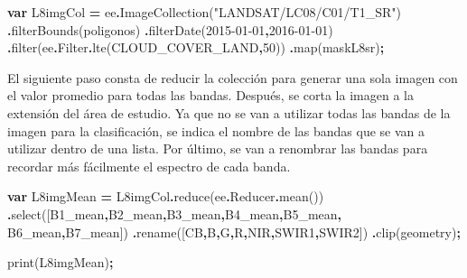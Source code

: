 \documentclass[
  12pt,
  letterpaper,
  twoside]{book}
\newenvironment{Shaded}{\begin{snugshade}}{\end{snugshade}}
\newcommand{\AttributeTok}[1]{\textcolor[rgb]{0.77,0.63,0.00}{#1}}
\newcommand{\DecValTok}[1]{\textcolor[rgb]{0.00,0.00,0.81}{#1}}
\newcommand{\FunctionTok}[1]{\textcolor[rgb]{0.00,0.00,0.00}{#1}}
\newcommand{\KeywordTok}[1]{\textcolor[rgb]{0.13,0.29,0.53}{\textbf{#1}}}
\newcommand{\NormalTok}[1]{#1}
\newcommand{\OperatorTok}[1]{\textcolor[rgb]{0.81,0.36,0.00}{\textbf{#1}}}
\newcommand{\StringTok}[1]{\textcolor[rgb]{0.31,0.60,0.02}{#1}}
\begin{document}
\begin{Shaded}
\begin{Highlighting}[]
\KeywordTok{var}\NormalTok{ L8imgCol }\OperatorTok{=}\NormalTok{ ee}\OperatorTok{.}\FunctionTok{ImageCollection}\NormalTok{(}\StringTok{"LANDSAT/LC08/C01/T1\_SR"}\NormalTok{)}
  \OperatorTok{.}\FunctionTok{filterBounds}\NormalTok{(poligonos)}
  \OperatorTok{.}\FunctionTok{filterDate}\NormalTok{(}\StringTok{\textquotesingle{}2015{-}01{-}01\textquotesingle{}}\OperatorTok{,}\StringTok{\textquotesingle{}2016{-}01{-}01\textquotesingle{}}\NormalTok{)}
  \OperatorTok{.}\FunctionTok{filter}\NormalTok{(ee}\OperatorTok{.}\AttributeTok{Filter}\OperatorTok{.}\FunctionTok{lte}\NormalTok{(}\StringTok{\textquotesingle{}CLOUD\_COVER\_LAND\textquotesingle{}}\OperatorTok{,}\DecValTok{50}\NormalTok{))}
  \OperatorTok{.}\FunctionTok{map}\NormalTok{(maskL8sr)}\OperatorTok{;}
\end{Highlighting}
\end{Shaded}

El siguiente paso consta de reducir la colección para generar una sola imagen con el valor promedio para todas las bandas. Después, se corta la imagen a la extensión del área de estudio. Ya que no se van a utilizar todas las bandas de la imagen para la clasificación, se indica el nombre de las bandas que se van a utilizar dentro de una lista. Por último, se van a renombrar las bandas para recordar más fácilmente el espectro de cada banda.

\begin{Shaded}
\begin{Highlighting}[]
\KeywordTok{var}\NormalTok{ L8imgMean }\OperatorTok{=}\NormalTok{ L8imgCol}\OperatorTok{.}\FunctionTok{reduce}\NormalTok{(ee}\OperatorTok{.}\AttributeTok{Reducer}\OperatorTok{.}\FunctionTok{mean}\NormalTok{())}
  \OperatorTok{.}\FunctionTok{select}\NormalTok{([}\StringTok{\textquotesingle{}B1\_mean\textquotesingle{}}\OperatorTok{,}\StringTok{\textquotesingle{}B2\_mean\textquotesingle{}}\OperatorTok{,}\StringTok{\textquotesingle{}B3\_mean\textquotesingle{}}\OperatorTok{,}\StringTok{\textquotesingle{}B4\_mean\textquotesingle{}}\OperatorTok{,}\StringTok{\textquotesingle{}B5\_mean\textquotesingle{}}\OperatorTok{,}
  \StringTok{\textquotesingle{}B6\_mean\textquotesingle{}}\OperatorTok{,}\StringTok{\textquotesingle{}B7\_mean\textquotesingle{}}\NormalTok{])}
  \OperatorTok{.}\FunctionTok{rename}\NormalTok{([}\StringTok{\textquotesingle{}CB\textquotesingle{}}\OperatorTok{,}\StringTok{\textquotesingle{}B\textquotesingle{}}\OperatorTok{,}\StringTok{\textquotesingle{}G\textquotesingle{}}\OperatorTok{,}\StringTok{\textquotesingle{}R\textquotesingle{}}\OperatorTok{,}\StringTok{\textquotesingle{}NIR\textquotesingle{}}\OperatorTok{,}\StringTok{\textquotesingle{}SWIR1\textquotesingle{}}\OperatorTok{,}\StringTok{\textquotesingle{}SWIR2\textquotesingle{}}\NormalTok{])}
  \OperatorTok{.}\FunctionTok{clip}\NormalTok{(geometry)}\OperatorTok{;}

\FunctionTok{print}\NormalTok{(L8imgMean)}\OperatorTok{;}
\end{Highlighting}
\end{Shaded}
\end{document}
